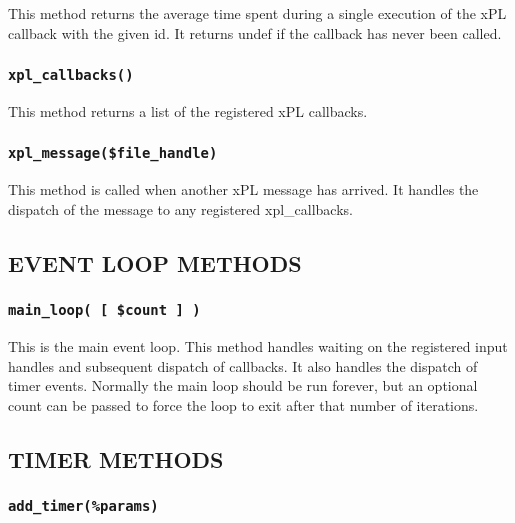 This method returns the average time spent during a single execution
of the xPL callback with the given id.  It returns undef if the
callback has never been called.

\subsubsection*{\texttt{xpl\_callbacks()}\label{xPL::Listener_xpl_callbacks_}}


This method returns a list of the registered xPL callbacks.

\subsubsection*{\texttt{xpl\_message(\$file\_handle)}\label{xPL::Listener_xpl_message_file_handle_}}


This method is called when another xPL message has arrived.  It handles
the dispatch of the message to any registered xpl\_callbacks.

\subsection*{EVENT LOOP METHODS\label{xPL::Listener_EVENT_LOOP_METHODS}}
\subsubsection*{\texttt{main\_loop( [ \$count ] )}\label{xPL::Listener_main_loop_count_}}


This is the main event loop.  This method handles waiting on the
registered input handles and subsequent dispatch of callbacks.  It
also handles the dispatch of timer events.  Normally the main loop
should be run forever, but an optional count can be passed to
force the loop to exit after that number of iterations.

\subsection*{TIMER METHODS\label{xPL::Listener_TIMER_METHODS}}
\subsubsection*{\texttt{add\_timer(\%params)}\label{xPL::Listener_add_timer_params_}}


